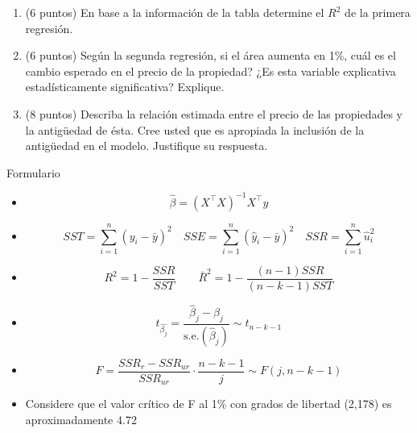 \documentclass[10pt,a4paper]{article}
\begin{document}
\begin{enumerate}
\begin{enumerate}
    \item (6 puntos) En base a la información de la tabla determine el $R^2$ de la primera regresión.
    \item (6 puntos) Según la segunda regresión, si el área aumenta en 1\%, cuál es el cambio esperado en el precio de la propiedad? ¿Es esta variable explicativa estadísticamente significativa? Explique.  
    \item (8 puntos) Describa la relación estimada entre el precio de las propiedades y la antig\"uedad de ésta. Cree usted que es apropiada la inclusión de la antig\"uedad en el modelo. Justifique su respuesta.
\end{enumerate}
    \end{enumerate}

    \newpage


\begin{center}
    {\Large Formulario  }

 
\end{center}

\begin{itemize}


\item  {\color{red} \[ \hat{\beta} = (X^{\top}X)^{-1}X^{\top}y \]}

\item 
	{\color{red}	\[ SST = \sum_{i=1}^{n} (y_i - \bar{y})^2 \quad SSE = \sum_{i=1}^{n} (\hat{y}_i - \bar{y})^2  \quad SSR = \sum_{i=1}^{n} \hat{u}_i^2\]}
		

    \item {\color{red} \[ R^2  = 1 - \frac{SSR}{SST} \quad \quad \bar{R}^2 =  1 - \frac{(n-1)SSR}{(n-k-1)SST} \]}

 \item {\color{red} \[ t_{\hat{\beta_j}}=\frac{\hat{\beta}_j - \beta_j}{\text{s.e.}(\hat{\beta}_j)} \sim t_{n-k-1} \]}

 \item {\color{red}\[
    F = \frac{SSR_{r} - SSR_{ur}}{SSR_{ur}} \cdot \frac{n - k - 1}{j} \sim F(j, n - k - 1)
    \]}

\item {\color{red}Considere que el valor crítico de F al 1\% con grados de libertad (2,178) es aproximadamente 4.72}

\end{itemize}
\end{document}
